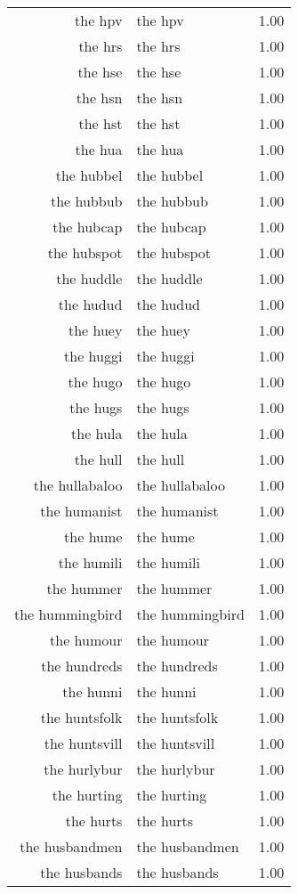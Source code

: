 \begin{table}[ht]
\begin{tabular}{rlr}
  the hpv & the hpv & 1.00 \\ 
  the hrs & the hrs & 1.00 \\ 
  the hse & the hse & 1.00 \\ 
  the hsn & the hsn & 1.00 \\ 
  the hst & the hst & 1.00 \\ 
  the hua & the hua & 1.00 \\ 
  the hubbel & the hubbel & 1.00 \\ 
  the hubbub & the hubbub & 1.00 \\ 
  the hubcap & the hubcap & 1.00 \\ 
  the hubspot & the hubspot & 1.00 \\ 
  the huddle & the huddle & 1.00 \\ 
  the hudud & the hudud & 1.00 \\ 
  the huey & the huey & 1.00 \\ 
  the huggi & the huggi & 1.00 \\ 
  the hugo & the hugo & 1.00 \\ 
  the hugs & the hugs & 1.00 \\ 
  the hula & the hula & 1.00 \\ 
  the hull & the hull & 1.00 \\ 
  the hullabaloo & the hullabaloo & 1.00 \\ 
  the humanist & the humanist & 1.00 \\ 
  the hume & the hume & 1.00 \\ 
  the humili & the humili & 1.00 \\ 
  the hummer & the hummer & 1.00 \\ 
  the hummingbird & the hummingbird & 1.00 \\ 
  the humour & the humour & 1.00 \\ 
  the hundreds & the hundreds & 1.00 \\ 
  the hunni & the hunni & 1.00 \\ 
  the huntsfolk & the huntsfolk & 1.00 \\ 
  the huntsvill & the huntsvill & 1.00 \\ 
  the hurlybur & the hurlybur & 1.00 \\ 
  the hurting & the hurting & 1.00 \\ 
  the hurts & the hurts & 1.00 \\ 
  the husbandmen & the husbandmen & 1.00 \\ 
  the husbands & the husbands & 1.00 \\ 

\end{tabular}
\end{table}
